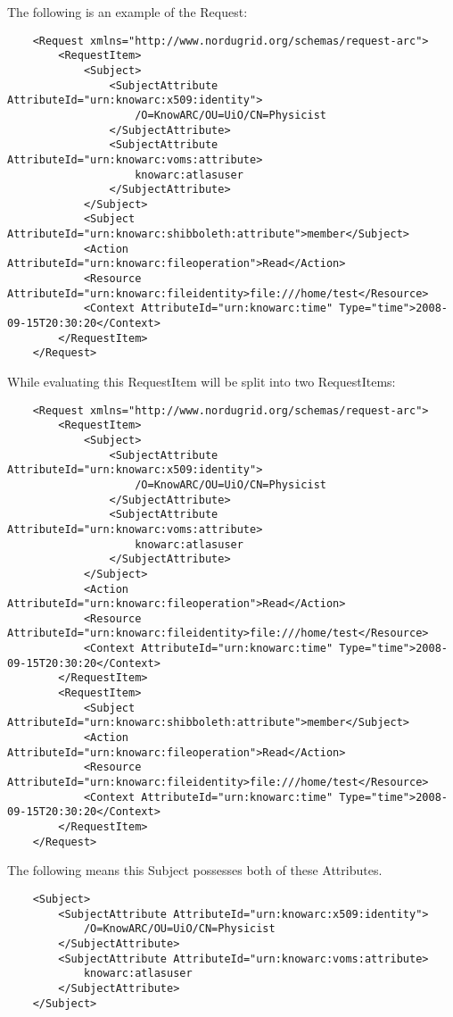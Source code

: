 \documentclass{book}
\begin{document}
The following is an example of the Request:

\begin{verbatim}
    <Request xmlns="http://www.nordugrid.org/schemas/request-arc">
        <RequestItem>
            <Subject>
                <SubjectAttribute AttributeId="urn:knowarc:x509:identity">
                    /O=KnowARC/OU=UiO/CN=Physicist
                </SubjectAttribute>
                <SubjectAttribute AttributeId="urn:knowarc:voms:attribute>
                    knowarc:atlasuser
                </SubjectAttribute>
            </Subject>
            <Subject AttributeId="urn:knowarc:shibboleth:attribute">member</Subject>
            <Action AttributeId="urn:knowarc:fileoperation">Read</Action>
            <Resource AttributeId="urn:knowarc:fileidentity>file:///home/test</Resource>
            <Context AttributeId="urn:knowarc:time" Type="time">2008-09-15T20:30:20</Context>
        </RequestItem>
    </Request>
\end{verbatim}

While evaluating this RequestItem will be split into two RequestItems:

\begin{verbatim}
    <Request xmlns="http://www.nordugrid.org/schemas/request-arc">
        <RequestItem>
            <Subject>
                <SubjectAttribute AttributeId="urn:knowarc:x509:identity">
                    /O=KnowARC/OU=UiO/CN=Physicist
                </SubjectAttribute>
                <SubjectAttribute AttributeId="urn:knowarc:voms:attribute>
                    knowarc:atlasuser
                </SubjectAttribute>
            </Subject>
            <Action AttributeId="urn:knowarc:fileoperation">Read</Action>
            <Resource AttributeId="urn:knowarc:fileidentity>file:///home/test</Resource>
            <Context AttributeId="urn:knowarc:time" Type="time">2008-09-15T20:30:20</Context>
        </RequestItem>
        <RequestItem>
            <Subject AttributeId="urn:knowarc:shibboleth:attribute">member</Subject>
            <Action AttributeId="urn:knowarc:fileoperation">Read</Action>
            <Resource AttributeId="urn:knowarc:fileidentity>file:///home/test</Resource>
            <Context AttributeId="urn:knowarc:time" Type="time">2008-09-15T20:30:20</Context>
        </RequestItem>
    </Request>
\end{verbatim}

The following means this Subject possesses both of these Attributes.

\begin{verbatim}
    <Subject>
        <SubjectAttribute AttributeId="urn:knowarc:x509:identity">
            /O=KnowARC/OU=UiO/CN=Physicist
        </SubjectAttribute>
        <SubjectAttribute AttributeId="urn:knowarc:voms:attribute>
            knowarc:atlasuser
        </SubjectAttribute>
    </Subject>
\end{verbatim}
\end{document}
